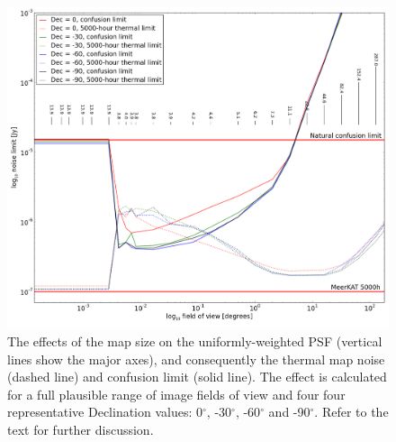 \documentclass{aa}
\begin{document}
\begin{minipage}{158mm}
\end{minipage}

\begin{figure}
\centering
\includegraphics[width = \columnwidth]{uniform_confusion}
\caption{The effects of the map size on the uniformly-weighted PSF (vertical lines show the major axes), and consequently the thermal map noise (dashed line) and confusion limit (solid line). The effect is calculated for a full plausible range of image fields of view and four four representative Declination values: 0$^{\circ}$, -30$^{\circ}$, -60$^{\circ}$ and -90$^{\circ}$. Refer to the text for further discussion.\label{fig:uniform_confusion}}
\end{figure}
\end{document}
